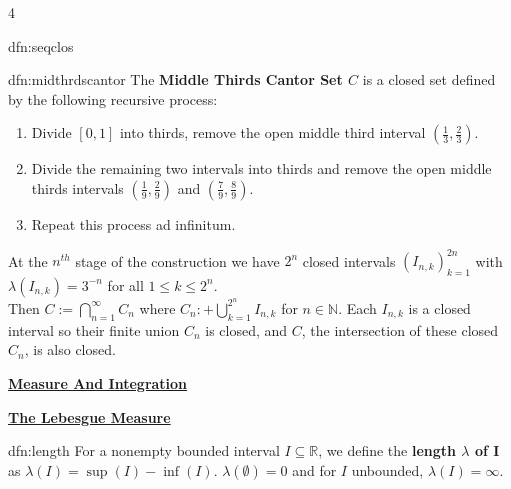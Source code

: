 \documentclass[landscape, 8pt]{extarticle}
\begin{document}
\begin{multicols*}{4}
\begin{dfn}{dfn:seqclos}{ }
		\end{dfn}
		
		
		\begin{dfn}{dfn:midthrdscantor}{ }
			The \textbf{Middle Thirds Cantor Set $C$} is a closed set defined by the following recursive process: 
			\begin{enumerate}[label=(\arabic*)]
				\item Divide $[0, 1]$ into thirds, remove the open middle third interval $(\frac{1}{3}, \frac{2}{3})$.
				\item Divide the remaining two intervals into thirds and remove the open middle thirds intervals $(\frac{1}{9}, \frac{2}{9})$ and $(\frac{7}{9}, \frac{8}{9})$.
				\item Repeat this process ad infinitum.
			\end{enumerate}
			At the $n^{th}$ stage of the construction we have $2^n$ closed intervals $(I_{n, k})_{k=1}^{2n}$ with $\lambda(I_{n, k}) = 3^{-n}$ for all $1 \le k \le 2^n$. \\
			Then $C := \bigcap_{n =1}^{\infty}C_n$ where $C_n :+ \bigcup_{k =1}^{2^n}I_{n, k}$ for $n \in \mathbb{N}$. Each $I_{n, k}$ is a closed interval so their finite union $C_n$ is closed, and $C$, the intersection of these closed $C_n$, is also closed.
			
		\end{dfn}
		
		
		
		
	\columnbreak
	
	
	
	\vspace*{-8pt}
	{\footnotesize \textbf{\underline{Measure And Integration}}}
	
	
	{\tiny\textbf{\underline{The Lebesgue Measure}}}
		
		
		
		\begin{dfn}[Length]{dfn:length}{ }
			For a nonempty bounded interval $I \subseteq \mathbb{R}$, we define the \textbf{length $\lambda$ of I} as $\lambda(I) = \sup(I) - \inf(I)$. $\lambda(\emptyset) = 0$ and for $I$ unbounded, $\lambda(I) = \infty$.
			
		\end{dfn}
		

\end{multicols*}
\end{document}
